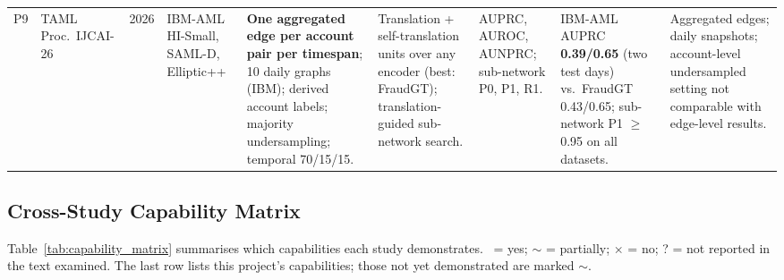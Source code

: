 \documentclass[11pt,a4paper]{article}
\begin{document}
\begin{landscape}
\begin{longtable}{L{0.55cm} L{2.3cm} L{0.8cm} L{2.6cm} L{2.9cm} L{3.0cm} L{2.1cm} L{3.2cm} L{3.6cm}}
\midrule
P9 & TAML \cite{rico2026taml}\newline Proc.\ IJCAI-26 & 2026 & IBM-AML HI-Small, SAML-D, Elliptic++ & \textbf{One aggregated edge per account pair per timespan}; 10 daily graphs (IBM); derived account labels; majority undersampling; temporal 70/15/15. & Translation + self-translation units over any encoder (best: FraudGT); translation-guided sub-network search. & AUPRC, AUROC, AUNPRC; sub-network P0, P1, R1. & IBM-AML AUPRC \textbf{0.39/0.65} (two test days) vs.\ FraudGT 0.43/0.65; sub-network P1 $\geq$0.95 on all datasets. & Aggregated edges; daily snapshots; account-level undersampled setting not comparable with edge-level results. \\
\end{longtable}
\end{landscape}

\subsection{Cross-Study Capability Matrix}
Table~\ref{tab:capability_matrix} summarises which capabilities each study demonstrates. \checkmark\ = yes; $\sim$ = partially; $\times$ = no; ? = not reported in the text examined. The last row lists this project's capabilities; those not yet demonstrated are marked $\sim$.
\end{document}
